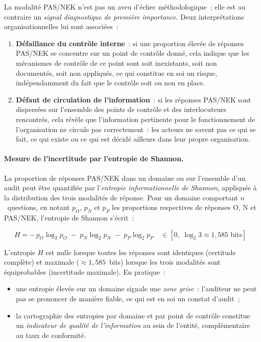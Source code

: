 La modalité PAS/NEK n'est pas un aveu d'échec méthodologique~; elle est au
contraire un \emph{signal diagnostique de première importance}. Deux
interprétations organisationnelles lui sont associées~:

\begin{enumerate}
  \item \textbf{Défaillance du contrôle interne}~: si une proportion élevée de
        réponses PAS/NEK se concentre sur un point de contrôle donné, cela
        indique que les mécanismes de contrôle de ce point sont soit inexistants,
        soit non documentés, soit non appliqués, ce qui constitue en
        soi un risque, indépendamment du fait que le contrôle soit ou non en
        place.
  \item \textbf{Défaut de circulation de l'information}~: si les réponses
        PAS/NEK sont dispersées sur l'ensemble des points de contrôle et des
        interlocuteurs rencontrés, cela révèle que l'information pertinente pour
        le fonctionnement de l'organisation ne circule pas correctement~: les
        acteurs ne savent pas ce qui se fait, ce qui existe ou ce qui est décidé
        ailleurs dans leur propre organisation.
\end{enumerate}

\paragraph{Mesure de l'incertitude par l'entropie de Shannon.}
La proportion de réponses PAS/NEK dans un domaine ou sur l'ensemble d'un audit
peut être quantifiée par l'\emph{entropie informationnelle de Shannon},
appliquée à la distribution des trois modalités de réponse. Pour un domaine
comportant $n$~questions, en notant $p_O$, $p_N$ et $p_P$ les proportions
respectives de réponses O, N et PAS/NEK, l'entropie de Shannon s'écrit~:

\begin{equation}
H = -\, p_O \log_2 p_O \;-\; p_N \log_2 p_N \;-\; p_P \log_2 p_P
\quad \in [0,\; \log_2 3 \approx 1{,}585 \text{ bits}]
\end{equation}

L'entropie $H$ est nulle lorsque toutes les réponses sont identiques (certitude
complète) et maximale ($\approx 1{,}585$~bits) lorsque les trois modalités sont
équiprobables (incertitude maximale). En pratique~:

\begin{itemize}
  \item une entropie élevée sur un domaine signale une \emph{zone grise}~:
        l'auditeur ne peut pas se prononcer de manière fiable, ce qui est en
        soi un constat d'audit~;
  \item la cartographie des entropies par domaine et par point de contrôle
        constitue un \emph{indicateur de qualité de l'information} au sein de
        l'entité, complémentaire au taux de conformité.
\end{itemize}

